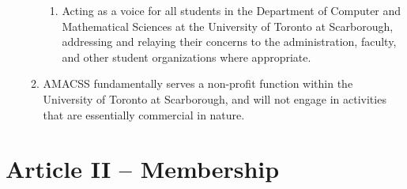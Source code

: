 \documentclass[12pt,a4paper]{article}
\begin{document}
\begin{enumerate}
\begin{enumerate}
\begin{enumerate}
\item Acting as a voice for all students in the Department of Computer and Mathematical Sciences at the University of Toronto at Scarborough, addressing and relaying their concerns to the administration, faculty, and other student organizations where appropriate.
\end{enumerate}

\item AMACSS fundamentally serves a non-profit function within the University of Toronto at Scarborough, and will not engage in activities that are essentially commercial in nature.
\end{enumerate}
\end{enumerate}

\section*{Article II – Membership}
\end{document}
